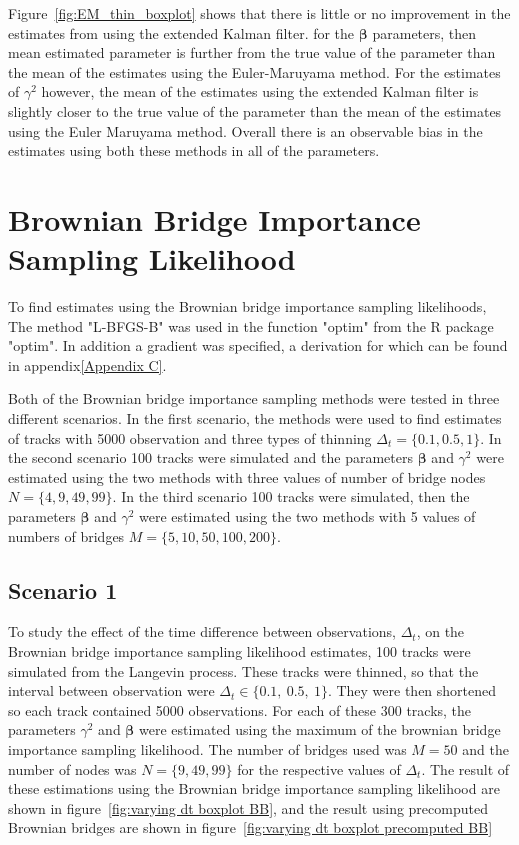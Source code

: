 Figure~\ref{fig:EM_thin_boxplot} shows that there is little or no improvement in the estimates from using the extended Kalman filter. for the $\bm \beta$ parameters, then mean estimated parameter is further from the true value of the parameter than the mean of the estimates using the Euler-Maruyama method. For the estimates of $\gamma^2$ however, the mean of the estimates using the extended Kalman filter is slightly closer to the true value of the parameter than the mean of the estimates using the Euler Maruyama method. Overall there is an observable bias in the estimates using both these methods in all of the parameters.

\section{Brownian Bridge Importance Sampling Likelihood}
\label{sec: BB test}
To find estimates using the Brownian bridge importance sampling likelihoods, The method "L-BFGS-B" was used in the function "optim" from the R package "optim". In addition a gradient was specified, a derivation for which can be found in appendix\ref{Appendix C}. 


Both of the Brownian bridge importance sampling methods were tested in three different scenarios. In the first scenario, the methods were used to find estimates of tracks with 5000 observation and three types of thinning $\Delta_t =\{0.1, 0.5, 1\}$. In the second scenario 100 tracks were simulated and the parameters $\bm \beta$ and $\gamma^2$ were estimated using the two methods with three values of number of bridge nodes $N=\{4, 9, 49, 99\}$. In the third scenario 100 tracks were simulated, then the parameters $\bm \beta$ and $\gamma^2$ were estimated using the two methods with 5 values of numbers of bridges $M=\{5,10,50,100,200\}$. 


\subsection{Scenario 1}
To study the effect of the time difference between observations, $\Delta_t$, on the Brownian bridge importance sampling likelihood estimates, 100 tracks were simulated from the Langevin process. These tracks were thinned, so that the interval between observation were $\Delta_t \in \{0.1, \ 0.5, \ 1\}$. They were then shortened so each track contained 5000 observations. For each of these 300 tracks, the parameters $\gamma^2$ and $\bm \beta$ were estimated using the maximum of the brownian bridge importance sampling likelihood. The number of bridges used was $M=50$ and the number of nodes was $N =\{9,49,99\}$ for the respective values of $\Delta_t$. The result of these estimations using the Brownian bridge importance sampling likelihood are shown in figure~\ref{fig:varying dt boxplot BB}, and the result using precomputed Brownian bridges are shown in figure~\ref{fig:varying dt boxplot precomputed BB}

